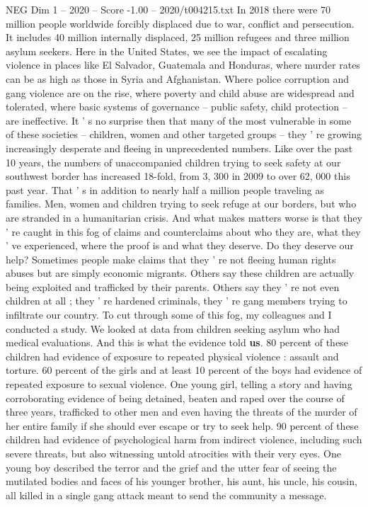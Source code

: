 \begin{textsample}{NEG Dim 1 – 2020 – Score -1.00 – 2020/t004215.txt}
In 2018 there were 70 million people worldwide forcibly displaced due to war, conflict and persecution.
It includes 40 million internally displaced, 25 million refugees and three million asylum seekers.
Here in the United States, we see the impact of escalating violence in places like El Salvador, Guatemala and Honduras, where murder rates can be as high as those in Syria and Afghanistan.
Where police corruption and gang violence are on the rise, where poverty and child abuse are widespread and tolerated, where basic systems of governance -- public safety, child protection -- are ineffective.
It ' s no surprise then that many of the most vulnerable in some of these societies -- children, women and other targeted groups -- they ' re growing increasingly desperate and fleeing in unprecedented numbers.
Like over the past 10 years, the numbers of unaccompanied children trying to seek safety at our southwest border has increased 18-fold, from 3, 300 in 2009 to over 62, 000 this past year.
That ' s in addition to nearly half a million people traveling as families.
Men, women and children trying to seek refuge at our borders, but who are stranded in a humanitarian crisis.
And what makes matters worse is that they ' re caught in this fog of claims and counterclaims about who they are, what they ' ve experienced, where the proof is and what they deserve.
Do they deserve our help?
Sometimes people make claims that they ' re not fleeing human rights abuses but are simply economic migrants.
Others say these children are actually being exploited and trafficked by their parents.
Others say they ' re not even children at all ; they ' re hardened criminals, they ' re gang members trying to infiltrate our country.
To cut through some of this fog, my colleagues and I conducted a study.
We looked at data from children seeking asylum who had medical evaluations.
And this is what the evidence told \textbf{us}. 80 percent of these children had evidence of exposure to repeated physical violence : assault and torture. 60 percent of the girls and at least 10 percent of the boys had evidence of repeated exposure to sexual violence.
One young girl, telling a story and having corroborating evidence of being detained, beaten and raped over the course of three years, trafficked to other men and even having the threats of the murder of her entire family if she should ever escape or try to seek help. 90 percent of these children had evidence of psychological harm from indirect violence, including such severe threats, but also witnessing untold atrocities with their very eyes.
One young boy described the terror and the grief and the utter fear of seeing the mutilated bodies and faces of his younger brother, his aunt, his uncle, his cousin, all killed in a single gang attack meant to send the community a message.

\end{textsample}
